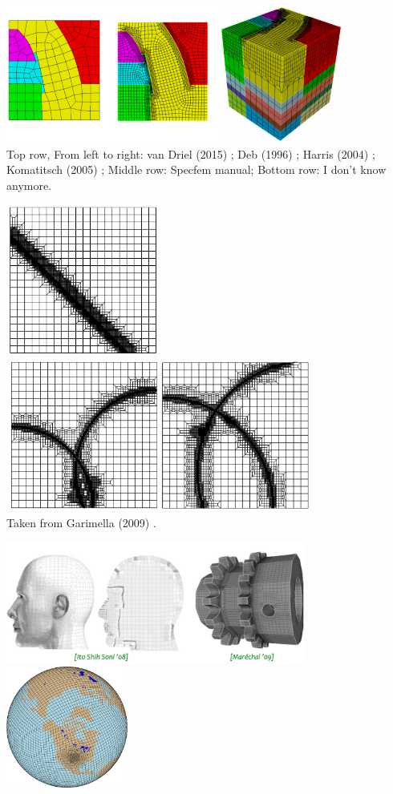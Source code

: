\begin{center}
\includegraphics[height=4.5cm]{images/meshes/conf3D}\\
{\captionfont 
Top row, From left to right: 
van Driel \etal (2015) \cite{vaks15}; 
Deb \etal (1996) \cite{depl96}; 
Harris \etal (2004) \cite{habo04}; 
Komatitsch \etal (2005) \cite{kott05}; 
Middle row: Specfem manual;
Bottom row: I don't know anymore.}
\end{center}

\begin{center}
\includegraphics[height=5cm]{images/meshes/gari09_a}
\includegraphics[height=5cm]{images/meshes/gari09_b}\\
{\captionfont Taken from Garimella (2009) \cite{gari09}.}
\end{center}

\begin{center}
\includegraphics[height=4cm]{images/meshes/newmeshref1}
\includegraphics[height=4cm]{images/meshes/newmeshref2}
\end{center}



